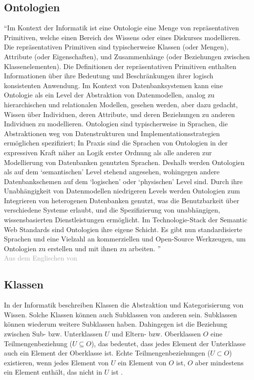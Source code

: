 \subsection{Ontologien}
\label{sub:ontology}
\enquote{Im Kontext der Informatik ist eine Ontologie eine Menge von repräsentativen Primitiven, welche einen Bereich des Wissens oder eines Diskurses modellieren.
Die repräsentativen Primitiven sind typischerweise Klassen (oder Mengen), Attribute (oder Eigenschaften), und Zusammenhänge (oder Beziehungen zwischen Klassenelementen).
Die Definitionen der repräsentativen Primitiven enthalten Informationen über ihre Bedeutung und Beschränkungen ihrer logisch konsistenten Anwendung.
Im Kontext von Datenbanksystemen kann eine Ontologie als ein Level der Abstraktion von Datenmodellen, analog zu hierarchischen und relationalen Modellen,
gesehen werden, aber dazu gedacht, Wissen über Individuen, deren Attribute, und deren Beziehungen zu anderen Individuen zu modellieren.
Ontologien sind typischerweise in Sprachen, die Abstraktionen weg von Datenstrukturen und Implementationsstrategien ermöglichen spezifiziert;
In Praxis sind die Sprachen von Ontologien in der expressiven Kraft näher an Logik erster Ordnung als alle anderen zur Modellierung von Datenbanken genutzten Sprachen.
Deshalb werden Ontologien als auf dem \enquote{semantischen} Level stehend angesehen, wohingegen andere Datenbankschemen auf dem \enquote{logischen} oder \enquote{physischen} Level sind.
Durch ihre Unabhängigkeit von Datenmodellen niedrigeren Levels werden Ontologien zum Integrieren von heterogenen Datenbanken genutzt,
was die Benutzbarkeit über verschiedene Systeme erlaubt, und die Spezifizierung von unabhängigen, wissensbasierten  Dienstleistungen ermöglicht.
Im Technologie-Stack der Semantic Web Standards sind Ontologien ihre eigene Schicht.
Es gibt nun standardisierte Sprachen und eine Vielzahl an kommerziellen und Open-Source Werkzeugen, um Ontologien zu erstellen und mit ihnen zu arbeiten.
}\\
\textcolor{darkgray}{Aus dem Englischen von \citet{ontologygruber}}

\subsection{Klassen}

In der Informatik beschreiben Klassen die Abstraktion und Kategorisierung von Wissen.
Solche Klassen können auch Subklassen von anderen sein.
Subklassen können wiederum weitere Subklassen haben.
Dahingegen ist die Beziehung zwischen Sub- bzw. Unterklassen $U$ und Eltern- bzw. Oberklassen $O$ eine Teilmengenbeziehung ($U \subseteq O$),
das bedeutet, dass jedes Element der Unterklasse auch ein Element der Oberklasse ist.
Echte Teilmengenbeziehungen ($U \subset O$) existieren, wenn jedes Element von $U$ ein Element von $O$ ist, $O$ aber mindestens ein Element enthält,
das nicht in $U$ ist \citep[S.~261]{semanticwebgrundlagen}.

